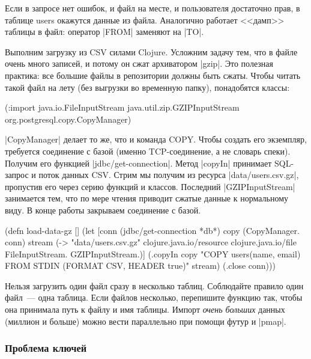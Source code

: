 Если в запросе нет ошибок, и файл на месте, и пользователя достаточно прав, в
таблице users окажутся данные из файла. Аналогично работает <<дамп>> таблицы в
файл: оператор \spverb|FROM| заменяют на \spverb|TO|.

Выполним загрузку из CSV силами Clojure. Усложним задачу тем, что в файле очень
много записей, и потому он сжат архиватором \spverb|gzip|. Это полезная
практика: все большие файлы в репозитории должны быть сжаты. Чтобы читать такой
файл на лету (без выгрузки во временную папку), понадобятся классы:

\begin{english}
  \begin{clojure}
(:import java.io.FileInputStream
         java.util.zip.GZIPInputStream
         org.postgresql.copy.CopyManager)
  \end{clojure}
\end{english}

\spverb|CopyManager| делает то же, что и команда COPY. Чтобы создать его
экземпляр, требуется соединение с базой (именно TCP-соединение, а не словарь
спеки). Получим его функцией \spverb|jdbc/get-connection|. Метод \spverb|copyIn|
принимает SQL-запрос и поток данных CSV. Стрим мы получим из ресурса
\spverb|data/users.csv.gz|, пропустив его через серию функций и
классов. Последний \spverb|GZIPInputStream| занимается тем, что по мере чтения
приводит сжатые данные к нормальному виду. В конце работы закрываем соединение с
базой.

\begin{english}
  \begin{clojure}
(defn load-data-gz []
  (let [conn (jdbc/get-connection *db*)
        copy (CopyManager. conn)
        stream (-> "data/users.csv.gz"
                   clojure.java.io/resource
                   clojure.java.io/file
                   FileInputStream.
                   GZIPInputStream.)]
    (.copyIn copy "COPY users(name, email)
                   FROM STDIN (FORMAT CSV, HEADER true)"
             stream)
    (.close conn)))
  \end{clojure}
\end{english}

Нельзя загрузить один файл сразу в несколько таблиц. Соблюдайте правило один
файл~--- одна таблица. Если файлов несколько, перепишите функцию так, чтобы она
принимала путь к файлу и имя таблицы. Импорт \emph{очень больших} данных
(миллион и больше) можно вести параллельно при помощи футур и \spverb|pmap|.

\subsubsection*{Проблема ключей}

